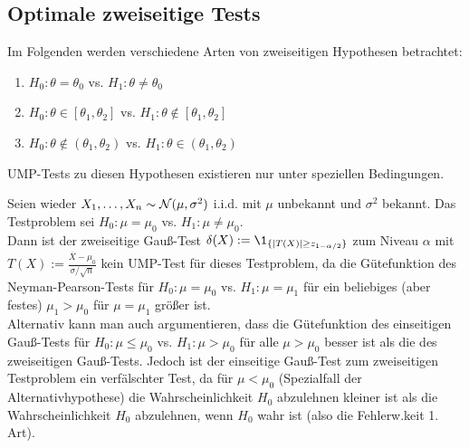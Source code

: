 \subsection{%
    Optimale zweiseitige Tests%
}

\begin{Bem}
    Im Folgenden werden verschiedene Arten von zweiseitigen Hypothesen betrachtet:
    \begin{enumerate}[label=\arabic*.]
        \item
        $H_0\colon \theta = \theta_0$ vs.
        $H_1\colon \theta \not= \theta_0$
        
        \item
        $H_0\colon \theta \in [\theta_1, \theta_2]$ vs.
        $H_1\colon \theta \notin [\theta_1, \theta_2]$
        
        \item
        $H_0\colon \theta \notin (\theta_1, \theta_2)$ vs.
        $H_1\colon \theta \in (\theta_1, \theta_2)$
    \end{enumerate}
    UMP-Tests zu diesen Hypothesen existieren nur unter speziellen Bedingungen.
\end{Bem}

\begin{Bsp}
    Seien wieder $X_1, \dotsc, X_n \sim \mathcal{N}(\mu, \sigma^2)$ i.i.d. mit $\mu$ unbekannt und
    $\sigma^2$ bekannt.
    Das Testproblem sei $H_0\colon \mu = \mu_0$ vs. $H_1\colon \mu \not= \mu_0$.\\
    Dann ist der zweiseitige Gauß-Test $\delta(X) := \1_{\{|T(X)| \ge z_{1-\alpha/2}\}}$
    zum Niveau $\alpha$ mit $T(X) := \frac{\overline{X} - \mu_0}{\sigma/\sqrt{n}}$
    kein UMP-Test für dieses Testproblem,
    da die Gütefunktion des Neyman-Pearson-Tests für
    $H_0\colon \mu = \mu_0$ vs. $H_1\colon \mu = \mu_1$ für ein beliebiges (aber festes)
    $\mu_1 > \mu_0$ für $\mu = \mu_1$ größer ist.\\
    Alternativ kann man auch argumentieren, dass die Gütefunktion des einseitigen Gauß-Tests für
    $H_0\colon \mu \le \mu_0$ vs. $H_1\colon \mu > \mu_0$ für alle $\mu > \mu_0$ besser ist
    als die des zweiseitigen Gauß-Tests.
    Jedoch ist der einseitige Gauß-Test zum zweiseitigen Testproblem ein verfälschter Test,
    da für $\mu < \mu_0$ (Spezialfall der Alternativhypothese) die Wahrscheinlichkeit
    $H_0$ abzulehnen kleiner ist als die Wahrscheinlichkeit $H_0$ abzulehnen, wenn $H_0$
    wahr ist (also die Fehlerw.keit 1. Art).
\end{Bsp}

